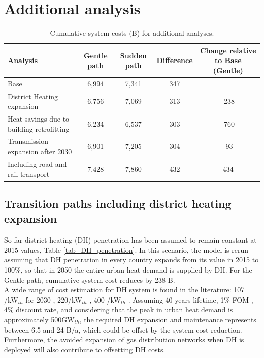 \documentclass[3p]{elsarticle} %
\begin{document}
\FloatBarrier
\section{Additional analysis}
\begin{table}[!h]
\footnotesize
\centering
\begin{threeparttable}
\caption{Cumulative system costs (B\EUR) for additional analyses.} \label{tab_additional_analyses}
\centering
\begin{tabularx}{17cm}{lcccc}
\toprule
Analysis & Gentle path & Sudden path & Difference & Change relative to Base (Gentle) \\
\midrule
Base	& 6,994	& 7,341	& 347 & \\
District Heating expansion	& 6,756	& 7,069	& 313 & -238 \\
Heat savings due to building retrofitting	& 6,234	& 6,537	& 303 & -760 \\
Transmission expansion after 2030 & 6,901 &	7,205	& 304 & -93 \\
Including road and rail transport &	7,428	& 7,860 &	432 & 434  \\
\bottomrule
\end{tabularx}
\end{threeparttable}
\end{table}

\subsection{Transition paths including district heating expansion} \label{sec_DH_exp}

So far district heating (DH) penetration has been assumed to remain constant at 2015 values, Table \ref{tab_DH_penetration}. In this scenario, the model is rerun assuming that DH penetration in every country expands from its value in 2015  to 100\%, so that in 2050 the entire urban heat demand is supplied by DH. For the Gentle path, cumulative system cost reduces by 238 B\EUR. \\

A wide range of cost estimation for DH system is found in the literature: 107 \EUR/kW$_{th}$ for 2030 \cite{in-depth-data}, 220\EUR/kW$_{th}$ \cite{Gerhardt_2015}, 400 \EUR/kW$_{th}$ \cite{Sterchele_2020}. Assuming 40 years lifetime, 1\% FOM \cite{Sterchele_2020}, 4\% discount rate,  and considering that the peak in urban heat demand is approximately 500GW$_{th}$, the required DH expansion and maintenance represents between 6.5 and 24 B\EUR/a, which could be offset by the system cost reduction.  Furthermore, the avoided expansion of gas distribution networks when DH is deployed will also contribute to offsetting DH costs. 
\end{document}
